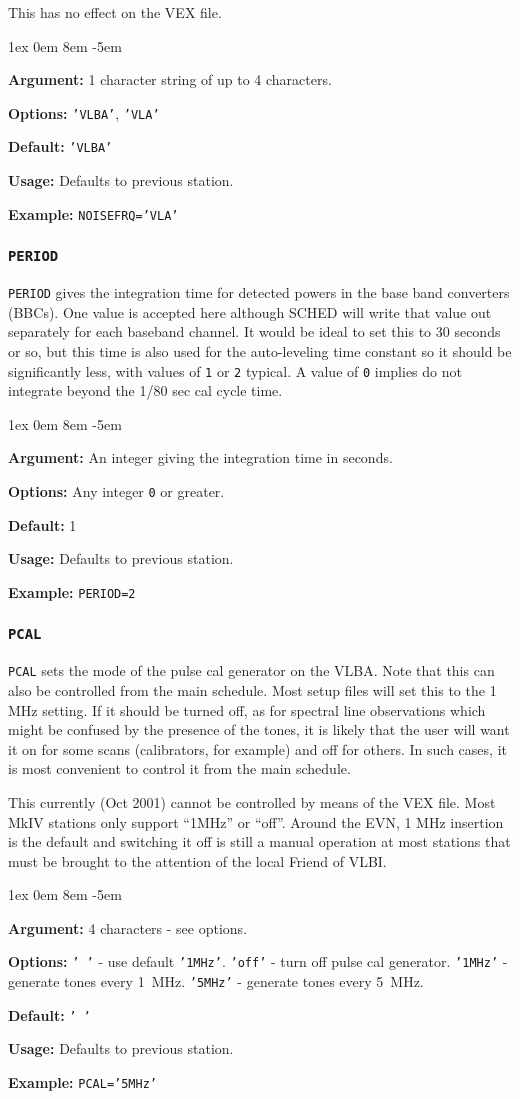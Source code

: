 \documentclass{report}
\newcommand{\rcwbox}[5]{
  \begin{list}{}{\parsep 1ex  \itemsep 0em
                 \leftmargin 8em  \itemindent -5em }
    \item {\bf Argument:} #1
    \item {\bf Options:}  #2
    \item {\bf Default:}  #3
    \item {\bf Usage:}    #4
    \item {\bf Example:}  #5
  \end{list}
}
\begin{document}
This has no effect on the VEX file.

\rcwbox
{1 character string of up to 4 characters.}
{{\tt 'VLBA'}, {\tt 'VLA'}}
{{\tt 'VLBA'}}
{Defaults to previous station.}
{{\tt NOISEFRQ='VLA'}}


\subsubsection{\label{SP:PERIOD}{\tt PERIOD}}

{\tt PERIOD} gives the integration time for detected powers in the
base band converters (BBCs). One value is accepted here although {\sc
SCHED} will write that value out separately for each baseband
channel. It would be ideal to set this to 30 seconds or so, but this
time is also used for the auto-leveling time constant so it should be
significantly less, with values of {\tt 1} or {\tt 2} typical. A value
of {\tt 0} implies do not integrate beyond the 1/80 sec cal cycle
time.

\rcwbox
{An integer giving the integration time in seconds.}
{Any integer {\tt 0} or greater.}
{1}
{Defaults to previous station.}
{{\tt PERIOD=2}}


\subsubsection{\label{SP:PCAL}{\tt PCAL}}

{\tt PCAL} sets the mode of the pulse cal generator on the VLBA.  Note
that this can also be controlled from the main schedule.  Most setup
files will set this to the 1 MHz setting.  If it should be turned
off, as for spectral line observations which might be confused by
the presence of the tones, it is likely that the user will want it
on for some scans (calibrators, for example) and off for others.  In
such cases, it is most convenient to control it from the main
schedule.

This currently (Oct 2001) cannot be controlled by means of the VEX
file. Most MkIV stations only support ``1MHz'' or ``off''. Around the
EVN, 1 MHz insertion is the default and switching it off is still a
manual operation at most stations that must be brought to the attention
of the local Friend of VLBI.

\rcwbox
{4 characters - see options.}
{{\tt ' '} - use default {\tt '1MHz'}. {\tt 'off'} - turn off pulse
cal generator. {\tt '1MHz'} - generate tones every 1~MHz. {\tt '5MHz'}
- generate tones every 5~MHz.}
{{\tt ' '}}
{Defaults to previous station.}
{{\tt PCAL='5MHz'}}
\end{document}
